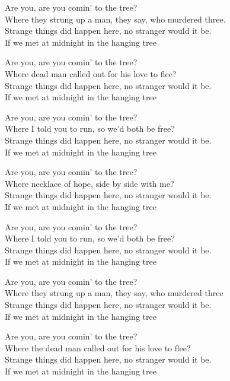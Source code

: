 \ve{}
Are you, are you comin' to the tree?\\
Where they strung up a man, they say, who murdered three.\\
Strange things did happen here, no stranger would it be.\\
If we met at midnight in the hanging tree

\ve{}
Are you, are you comin' to the tree?\\
Where dead man called out for his love to flee?\\
Strange things did happen here, no stranger would it be.\\
If we met at midnight in the hanging tree

\ve{}
Are you, are you comin' to the tree?\\
Where I told you to run, so we'd both be free?\\
Strange things did happen here, no stranger would it be.\\
If we met at midnight in the hanging tree

\ve{}
Are you, are you comin' to the tree?\\
Where necklace of hope, side by side with me?\\
Strange things did happen here, no stranger would it be.\\
If we met at midnight in the hanging tree

\ve{}
Are you, are you comin' to the tree?\\
Where I told you to run, so we'd both be free?\\
Strange things did happen here, no stranger would it be.\\
If we met at midnight in the hanging tree

\ve{}
Are you, are you comin' to the tree?\\
Where they strung up a man, they say, who murdered three\\
Strange things did happen here, no stranger would it be.\\
If we met at midnight in the hanging tree

\ve{}
Are you, are you comin' to the tree?\\
Where the dead man called out for his love to flee?\\
Strange things did happen here, no stranger would it be.\\
If we met at midnight in the hanging tree


\esong{}